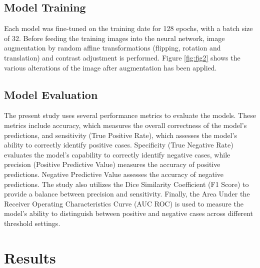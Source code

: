 \documentclass{article}
\begin{document}
\subsection{Model Training}
Each model was fine-tuned on the training date for 128 epochs, with a batch size of 32. Before feeding the training images into the neural network, image augmentation by random affine transformations (flipping, rotation and translation) and contrast adjustment is performed. Figure \ref{fig:fig2} shows the various alterations of the image after augmentation has been applied.

\subsection{Model Evaluation}
The present study uses several performance metrics to evaluate the models. These metrics include accuracy, which measures the overall correctness of the model's predictions, and sensitivity (True Positive Rate), which assesses the model's ability to correctly identify positive cases. Specificity (True Negative Rate) evaluates the model's capability to correctly identify negative cases, while precision (Positive Predictive Value) measures the accuracy of positive predictions. Negative Predictive Value assesses the accuracy of negative predictions. The study also utilizes the Dice Similarity Coefficient (F1 Score) to provide a balance between precision and sensitivity. Finally, the Area Under the Receiver Operating Characteristics Curve (AUC ROC) is used to measure the model's ability to distinguish between positive and negative cases across different threshold settings.

\section{Results}
\end{document}
